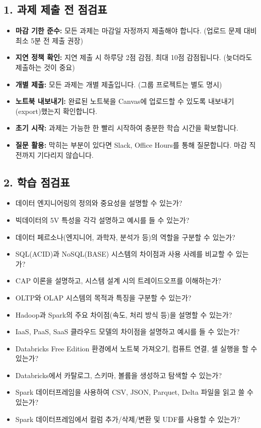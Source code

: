 \documentclass[11pt,a4paper]{article}
\begin{document}
\begin{itemize}
\subsection*{1. 과제 제출 전 점검표}

\begin{itemize}
    \item \textbf{마감 기한 준수:} 모든 과제는 마감일 자정까지 제출해야 합니다. (업로드 문제 대비 최소 5분 전 제출 권장)
    \item \textbf{지연 정책 확인:} 지연 제출 시 하루당 2점 감점, 최대 10점 감점됩니다. (늦더라도 제출하는 것이 중요)
    \item \textbf{개별 제출:} 모든 과제는 개별 제출입니다. (그룹 프로젝트는 별도 명시)
    \item \textbf{노트북 내보내기:} 완료된 노트북을 Canvas에 업로드할 수 있도록 내보내기(export)했는지 확인합니다.
    \item \textbf{초기 시작:} 과제는 가능한 한 빨리 시작하여 충분한 학습 시간을 확보합니다.
    \item \textbf{질문 활용:} 막히는 부분이 있다면 Slack, Office Hours를 통해 질문합니다. 마감 직전까지 기다리지 않습니다.
\end{itemize}

\subsection*{2. 학습 점검표}

\begin{itemize}
    \item 데이터 엔지니어링의 정의와 중요성을 설명할 수 있는가?
    \item 빅데이터의 5V 특성을 각각 설명하고 예시를 들 수 있는가?
    \item 데이터 페르소나(엔지니어, 과학자, 분석가 등)의 역할을 구분할 수 있는가?
    \item SQL(ACID)과 NoSQL(BASE) 시스템의 차이점과 사용 사례를 비교할 수 있는가?
    \item CAP 이론을 설명하고, 시스템 설계 시의 트레이드오프를 이해하는가?
    \item OLTP와 OLAP 시스템의 목적과 특징을 구분할 수 있는가?
    \item Hadoop과 Spark의 주요 차이점(속도, 처리 방식 등)을 설명할 수 있는가?
    \item IaaS, PaaS, SaaS 클라우드 모델의 차이점을 설명하고 예시를 들 수 있는가?
    \item Databricks Free Edition 환경에서 노트북 가져오기, 컴퓨트 연결, 셀 실행을 할 수 있는가?
    \item Databricks에서 카탈로그, 스키마, 볼륨을 생성하고 탐색할 수 있는가?
    \item Spark 데이터프레임을 사용하여 CSV, JSON, Parquet, Delta 파일을 읽고 쓸 수 있는가?
    \item Spark 데이터프레임에서 컬럼 추가/삭제/변환 및 UDF를 사용할 수 있는가?
\end{itemize}


\end{itemize}
\end{document}
